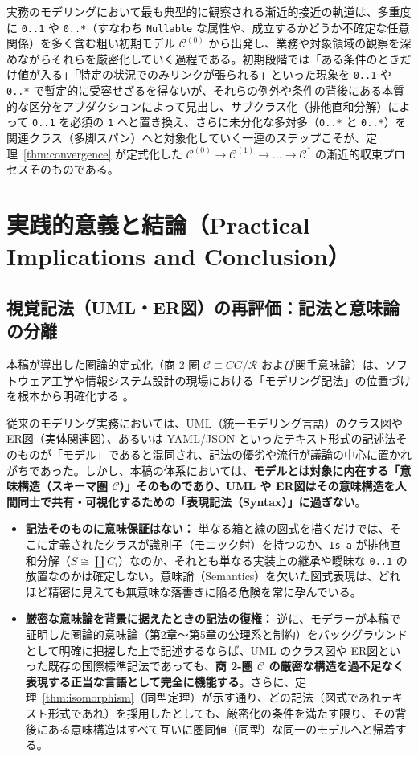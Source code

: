 \documentclass[11pt,a4paper]{ltjsarticle}
\theoremstyle{definition}
\theoremstyle{plain}
\theoremstyle{remark}
\begin{document}
実務のモデリングにおいて最も典型的に観察される漸近的接近の軌道は、多重度に \texttt{0..1} や \texttt{0..*}（すなわち \texttt{Nullable} な属性や、成立するかどうか不確定な任意関係）を多く含む粗い初期モデル $\mathcal{C}^{(0)}$ から出発し、業務や対象領域の観察を深めながらそれらを厳密化していく過程である。初期段階では「ある条件のときだけ値が入る」「特定の状況でのみリンクが張られる」といった現象を \texttt{0..1} や \texttt{0..*} で暫定的に受容せざるを得ないが、それらの例外や条件の背後にある本質的な区分をアブダクションによって見出し、サブクラス化（排他直和分解）によって \texttt{0..1} を必須の \texttt{1} へと置き換え、さらに未分化な多対多（\texttt{0..*} と \texttt{0..*}）を関連クラス（多脚スパン）へと対象化していく一連のステップこそが、定理~\ref{thm:convergence} が定式化した $\mathcal{C}^{(0)} \to \mathcal{C}^{(1)} \to \dots \to \mathcal{C}^*$ の漸近的収束プロセスそのものである。

\section{実践的意義と結論（Practical Implications and Conclusion）}

\subsection{視覚記法（UML・ER図）の再評価：記法と意味論の分離}
本稿が導出した圏論的定式化（商 2-圏 $\mathcal{C} \equiv CG/\mathcal{R}$ および関手意味論）は、ソフトウェア工学や情報システム設計の現場における「モデリング記法」の位置づけを根本から明確化する \cite{shlaer1988,shlaer1992,mellor2002}。

従来のモデリング実務においては、UML（統一モデリング言語）のクラス図や ER図（実体関連図）\cite{chen1976}、あるいは YAML/JSON といったテキスト形式の記述法そのものが「モデル」であると混同され、記法の優劣や流行が議論の中心に置かれがちであった。しかし、本稿の体系においては、\textbf{モデルとは対象に内在する「意味構造（スキーマ圏 $\mathcal{C}$）」そのものであり、UML や ER図はその意味構造を人間同士で共有・可視化するための「表現記法（Syntax）」に過ぎない}。

\begin{itemize}
    \item \textbf{記法そのものに意味保証はない：} 単なる箱と線の図式を描くだけでは、そこに定義されたクラスが識別子（モニック射）を持つのか、\texttt{Is-a} が排他直和分解（$S \cong \coprod C_i$）なのか、それとも単なる実装上の継承や曖昧な \texttt{0..1} の放置なのかは確定しない。意味論（Semantics）を欠いた図式表現は、どれほど精密に見えても無意味な落書きに陥る危険を常に孕んでいる。
    \item \textbf{厳密な意味論を背景に据えたときの記法の復権：} 逆に、モデラーが本稿で証明した圏論的意味論（第2章〜第5章の公理系と制約）をバックグラウンドとして明確に把握した上で記述するならば、UML のクラス図や ER図といった既存の国際標準記法であっても、\textbf{商 2-圏 $\mathcal{C}$ の厳密な構造を過不足なく表現する正当な言語として完全に機能する}。さらに、定理~\ref{thm:isomorphism}（同型定理）が示す通り、どの記法（図式であれテキスト形式であれ）を採用したとしても、厳密化の条件を満たす限り、その背後にある意味構造はすべて互いに圏同値（同型）な同一のモデルへと帰着する。
\end{itemize}
\end{document}
